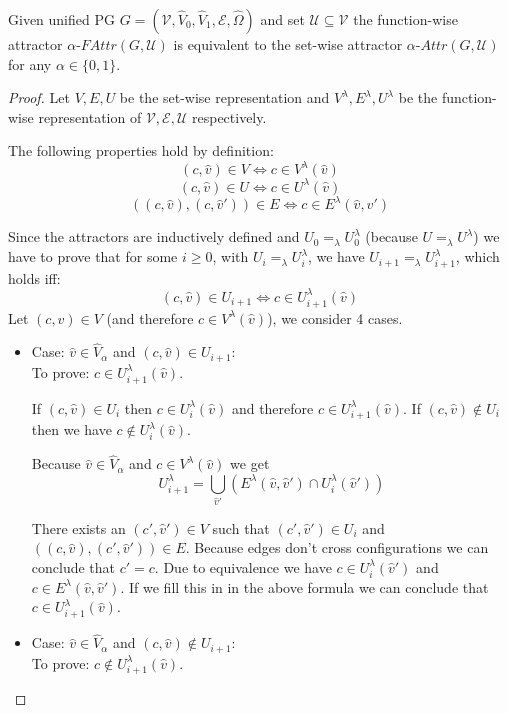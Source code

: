 \begin{lemma}
	\label{lem_attr_equal}
	Given unified PG $G = (\mathcal{V},\hat{V}_0,\hat{V}_1, \mathcal{E}, \hat{\Omega})$ and set $\mathcal{U} \subseteq \mathcal{V}$ the function-wise attractor $\alpha\textit{-FAttr}(G,\mathcal{U})$ is equivalent to the set-wise attractor $\alpha\textit{-Attr}(G,\mathcal{U})$ for any $\alpha \in \{0,1\}$.
	\begin{proof}
		Let $V,E,U$ be the set-wise representation and $V^\lambda,E^\lambda,U^\lambda$ be the function-wise representation of $\mathcal{V},\mathcal{E},\mathcal{U}$ respectively.
		
		The following properties hold by definition:
		\[ (c,\hat{v}) \in V \iff c \in V^\lambda(\hat{v})\]
		\[ (c,\hat{v}) \in U \iff c \in U^\lambda(\hat{v})\]
		\[ ((c,\hat{v}),(c,\hat{v}')) \in E \iff c \in E^\lambda(\hat{v},\hat{v}') \]
		
		Since the attractors are inductively defined and $U_0 =_\lambda U^\lambda_0$ (because $U =_\lambda U^\lambda$) we have to prove that for some $i \geq 0$, with $U_i =_\lambda U^\lambda_i$,  we have $U_{i+1} =_\lambda U^\lambda_{i+1}$, which holds iff:
		\[ (c,\hat{v}) \in U_{i+1} \iff c \in U^\lambda_{i+1}(\hat{v}) \]
		Let $(c,\hat{v}) \in V$ (and therefore $c \in V^\lambda(\hat{v})$), we consider 4 cases.
		\begin{itemize}
			\item Case: $\hat{v} \in \hat{V}_{\alpha}$ and $(c,\hat{v}) \in U_{i+1}$:\\
			To prove: $c \in U^\lambda_{i+1}(\hat{v})$.
			
			If $(c,\hat{v}) \in U_i$ then $c \in U^\lambda_i(\hat{v})$ and therefore $c \in U^\lambda_{i+1}(\hat{v})$. If $(c,\hat{v}) \notin U_i$ then we have $c \notin U^\lambda_i(\hat{v})$.
			
			
			Because $\hat{v} \in \hat{V}_{\alpha}$ and $c \in V^\lambda(\hat{v})$ we get
			\[ U^\lambda_{i+1} =\bigcup_{\hat{v}'} (E^\lambda(\hat{v},\hat{v}') \cap U^\lambda_i(\hat{v}')) \]
			
			There exists an $(c',\hat{v}') \in V$ such that $(c',\hat{v}') \in U_i$ and $((c,\hat{v}),(c',\hat{v}')) \in E$. Because edges don't cross configurations we can conclude that $c' = c$. Due to equivalence we have $c \in U^\lambda_i(\hat{v}')$ and $c \in E^\lambda(\hat{v},\hat{v}')$. If we fill this in in the above formula we can conclude that $c \in U^\lambda_{i+1}(\hat{v})$.
			\item Case: $\hat{v} \in \hat{V}_{\alpha}$ and $(c,\hat{v}) \notin U_{i+1}$:\\
			To prove: $c \notin U^\lambda_{i+1}(\hat{v})$.
			

\end{itemize}
\end{proof}
\end{lemma}
